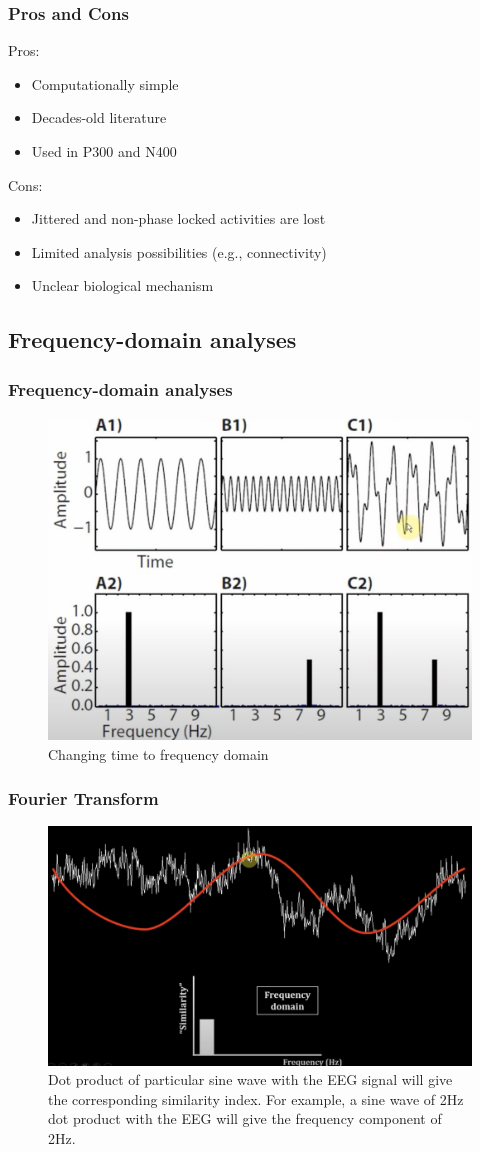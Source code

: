 \documentclass{beamer}
\begin{document}
\begin{frame}
\frametitle{Pros and Cons}
Pros:
\begin{itemize}
	\item Computationally simple
	\item Decades-old literature
	\item Used in P300 and N400
\end{itemize}
Cons:
\begin{itemize}
	\item Jittered and non-phase locked activities are lost
	\item Limited analysis possibilities (e.g., connectivity)
	\item Unclear biological mechanism
\end{itemize}
\end{frame}

\subsection{Frequency-domain analyses}

\begin{frame}
\frametitle{Frequency-domain analyses}
\begin{figure}
		\includegraphics[width=0.7\linewidth]{image/frequency}
		\caption{Changing time to frequency domain}
\end{figure}
\end{frame}

\begin{frame}
\frametitle{Fourier Transform}
\begin{figure}
		\includegraphics[width=0.7\linewidth]{image/ft}
		\caption{Dot product of particular sine wave with the EEG signal will give the corresponding similarity index.  For example, a sine wave of 2Hz dot product with the EEG will give the frequency component of 2Hz.}
\end{figure}
\end{frame}
\end{document}
